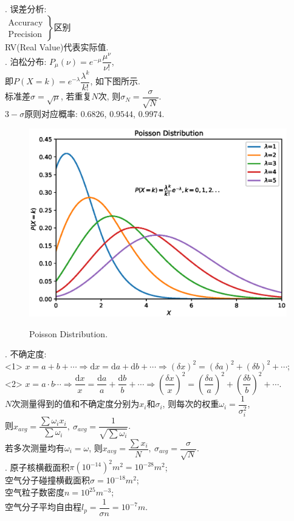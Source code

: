 \documentclass[12pt, 
]{article}
\begin{document}
. 误差分析:
~\\\phantom{~~~~}
$
	\left.
	\begin{array}{l}
		\text{Accuracy}\\
		\text{Precision}
	\end{array}\right\}\text{区别}
$
~\\\phantom{~~~~}RV(Real Value)代表实际值.
~\\

. 泊松分布: $P_\mu(\nu)=e^{-\mu}\dfrac{\mu^\nu}{\nu!}$,
~\\\phantom{~~~~}即$P(X=k)=e^{-\lambda}\dfrac{\lambda^k}{k!}$, 如下图所示.
~\\\phantom{~~~~}标准差$\sigma=\sqrt{\mu}$, 若重复$N$次, 则$\sigma_N=\dfrac{\sigma}{\sqrt{N}}$.
~\\\phantom{~~~~}$3-\sigma$原则对应概率: $0.6826$, $0.9544$, $0.9974$.

\begin{figure}[ht]
	\centering
	\includegraphics[width=.7\textwidth]{Poisson.eps}
	\label{fg:19}
	\caption{Poisson Distribution.}
\end{figure}

. 不确定度:
~\\\phantom{~~~~}<1> $x=a+b+\cdots \Rightarrow \mathrm{d}x=\mathrm{d}a+\mathrm{d}b+\cdots\Rightarrow(\delta x)^2=(\delta a)^2+(\delta b)^2+\cdots$;
~\\\phantom{~~~~}<2> $x=a\cdot b\cdots\Rightarrow\dfrac{\mathrm{d}x}{x}=\dfrac{\mathrm{d}a}{a}+\dfrac{\mathrm{d}b}{b}+\cdots\Rightarrow(\dfrac{\delta x}{x})^2=(\dfrac{\delta a}{a})^2+(\dfrac{\delta b}{b})^2+\cdots$.
~\\\phantom{~~~~}$N$次测量得到的值和不确定度分别为$x_i$和$\sigma_i$, 则每次的权重$\omega_i=\dfrac{1}{\sigma_i^2}$,
~\\\phantom{~~~~}则$x_{avg}=\dfrac{\sum\omega_ix_i}{\sum\omega_i},~\sigma_{avg}=\dfrac{1}{\sqrt{\sum\omega_i}}$.
~\\\phantom{~~~~}若多次测量均有$\omega_i=\omega$, 则$x_{avg}=\dfrac{\sum x_i}{N},~\sigma_{avg}=\dfrac{\sigma}{\sqrt{N}}$.
~\\

. 原子核横截面积$\pi(10^{-14})^2m^2=10^{-28}m^2$;
~\\\phantom{~~~~}空气分子碰撞横截面积$\sigma=10^{-18}m^2$;
~\\\phantom{~~~~}空气粒子数密度$n=10^{25}m^{-3}$;
~\\\phantom{~~~~}空气分子平均自由程$l_p=\dfrac{1}{\sigma n}=10^{-7}m$.
\end{document}
